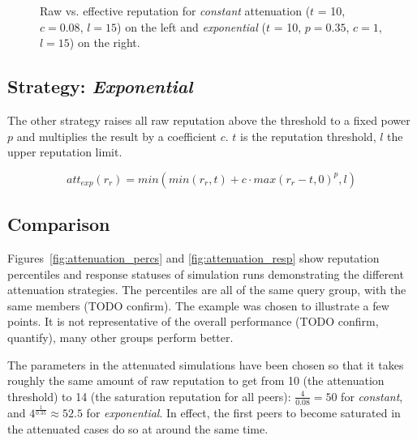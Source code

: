 \begin{figure}[t]
\centering
{}%
\caption{Raw vs. effective reputation for \emph{constant} attenuation ($t$ = 10,
$c = 0.08$, $l = 15$) on the left and \emph{exponential} ($t$ = 10, $p = 0.35$,
$c = 1$, $l = 15$) on the right.}
\label{fig:att_raw_vs_eff}
\end{figure}

\subsection{Strategy: \emph{Exponential}}
The other strategy raises all raw reputation above the threshold to a fixed
power $p$ and multiplies the result by a coefficient $c$. $t$ is the reputation
threshold, $l$ the upper reputation limit.

\[att_{exp}(r_r) = min(min(r_r, t) + c \cdot max(r_r - t, 0)^p, l)\]

\subsection{Comparison}
Figures~\ref{fig:attenuation_percs} and \ref{fig:attenuation_resp} show
reputation percentiles and response statuses of simulation runs demonstrating
the different attenuation strategies. The percentiles are all of the same query
group, with the same members (TODO confirm). The example was chosen to
illustrate a few points. It is not representative of the overall performance
(TODO confirm, quantify), many other groups perform better.

The parameters in the attenuated simulations have been chosen so that it takes
roughly the same amount of raw reputation to get from 10 (the attenuation
threshold) to 14 (the saturation reputation for all peers): $\frac{4}{0.08} =
50$ for \emph{constant}, and $4^{\frac{1}{0.35}} \approx 52.5$ for
\emph{exponential}. In effect, the first peers to become saturated in the
attenuated cases do so at around the same time.

